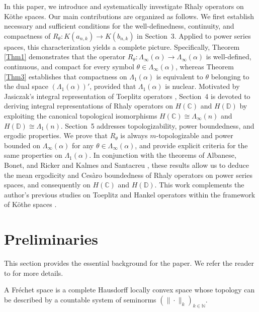 \documentclass{birkjour}
\theoremstyle{definition}
\theoremstyle{remark}
\numberwithin{equation}{section}
\begin{document}
In this paper, we introduce and systematically investigate Rhaly operators on Köthe spaces. Our main contributions are organized as follows. We first establish necessary and sufficient conditions for the well-definedness, continuity, and compactness of $R_\theta:K(a_{n,k})\to K(b_{n,k})$ in Section~3. Applied to power series spaces, this characterization yields a complete picture. Specifically, Theorem \ref{Thm1} demonstrates that the operator $R_\theta:\Lambda_\infty(\alpha) \to\Lambda_\infty(\alpha)$ is well-defined, continuous, and compact for every symbol $\theta\in\Lambda_\infty(\alpha)$, whereas Theorem \ref{Thm3} establishes that compactness on $\Lambda_1(\alpha)$ is equivalent to $\theta$ belonging to the dual space $(\Lambda_1(\alpha))'$, provided that $\Lambda_1(\alpha)$ is nuclear. Motivated by Jasiczak's integral representation of Toeplitz operators \cite{J1,J2}, Section~4 is devoted to deriving integral representations of Rhaly operators on $H(\mathbb{C})$ and $H(\mathbb{D})$ by exploiting the canonical topological isomorphisms $H(\mathbb{C})\cong\Lambda_\infty(n)$ and $H(\mathbb{D})\cong\Lambda_1(n).$ Section~5 addresses topologizability, 
power boundedness, and ergodic properties. We prove that $R_\theta$ is always $m$-topologizable and power bounded on $\Lambda_\infty(\alpha)$ for any $\theta\in\Lambda_\infty(\alpha)$, and provide explicit criteria for the same properties on $\Lambda_1(\alpha).$ In conjunction with the theorems of Albanese, Bonet, and Ricker \cite{ABR} and Kalmes and Santacreu \cite{K1}, these results allow us to deduce the mean ergodicity and Ces\`{a}ro boundedness of Rhaly operators on power series spaces, and consequently on $H(\mathbb{C})$ and $H(\mathbb{D}).$ This work complements the author's previous studies on Toeplitz and Hankel operators within the framework of Köthe spaces \cite{N1,N2,N3}.


\section{Preliminaries}
This section provides the essential background for the paper. We refer the reader to \cite{MV} for more details. 

A Fréchet space is a complete Hausdorff locally convex space whose topology can be described by a countable system of seminorms $(\|\cdot\|_{k})_{k\in \mathbb{N}}$.
\end{document}

